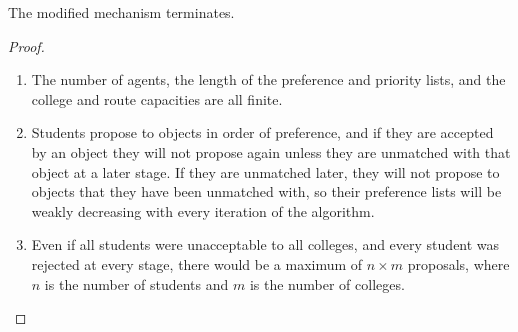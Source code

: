\documentclass[runningheads]{llncs}
\begin{document}
\begin{theorem}
The modified mechanism terminates.
\end{theorem}

\begin{proof}
    \begin{enumerate}
        \item The number of agents, the length of the preference and priority lists, and the college and route capacities are all finite.
        \item Students propose to objects in order of preference, and if they are accepted by an object they will not propose again unless they are unmatched with that object at a later stage. If they are unmatched later, they will not propose to objects that they have been unmatched with, so their preference lists will be weakly decreasing with every iteration of the algorithm.
        \item Even if all students were unacceptable to all colleges, and every student was rejected at every stage, there would be a maximum of $n \times m$ proposals, where $n$ is the number of students and $m$ is the number of colleges.
    \end{enumerate}
\end{proof}
\end{document}
